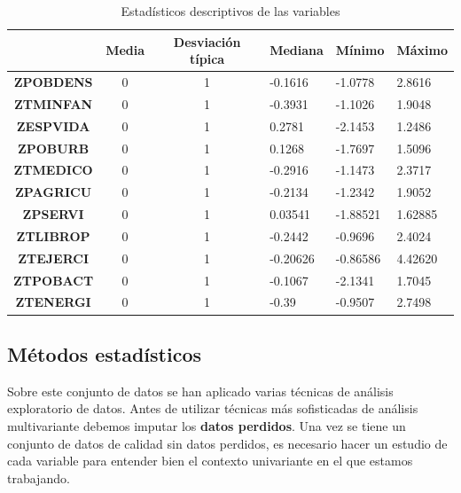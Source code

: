\documentclass[letterpaper,11pt]{article}
\begin{document}
\begin{table}[]
\centering
\renewcommand{\tablename}{Tabla}
\begin{tabular}{ccclll}
\hline
                  & \textbf{Media} & \textbf{Desviación típica} & \textbf{Mediana} & \textbf{Mínimo} & \textbf{Máximo} \\ \hline
\textbf{ZPOBDENS} & 0              & 1                          & -0.1616          & -1.0778         & 2.8616          \\ 
\textbf{ZTMINFAN} & 0              & 1                          & -0.3931          & -1.1026         & 1.9048          \\ 
\textbf{ZESPVIDA} & 0              & 1                          & 0.2781           & -2.1453         & 1.2486          \\ 
\textbf{ZPOBURB}  & 0              & 1                          & 0.1268           & -1.7697         & 1.5096          \\ 
\textbf{ZTMEDICO} & 0              & 1                          & -0.2916          & -1.1473         & 2.3717          \\ 
\textbf{ZPAGRICU} & 0              & 1                          & -0.2134          & -1.2342         & 1.9052          \\ 
\textbf{ZPSERVI}  & 0              & 1                          & 0.03541          & -1.88521        & 1.62885         \\ 
\textbf{ZTLIBROP} & 0              & 1                          & -0.2442          & -0.9696         & 2.4024          \\ 
\textbf{ZTEJERCI} & 0              & 1                          & -0.20626         & -0.86586        & 4.42620         \\ 
\textbf{ZTPOBACT} & 0              & 1                          & -0.1067          & -2.1341         & 1.7045          \\ 
\textbf{ZTENERGI} & 0              & 1                          & -0.39            & -0.9507         & 2.7498     		\\ \hline    
\end{tabular}
\caption{Estadísticos descriptivos de las variables}
\label{summary}
\end{table}

\subsection{Métodos estadísticos}

Sobre este conjunto de datos se han aplicado varias técnicas de análisis exploratorio de datos. Antes de utilizar técnicas más sofisticadas de análisis multivariante debemos imputar los \textbf{datos perdidos}. Una vez se tiene un conjunto de datos de calidad sin datos perdidos, es necesario hacer un estudio de cada variable para entender bien el contexto univariante en el que estamos trabajando.
\end{document}
